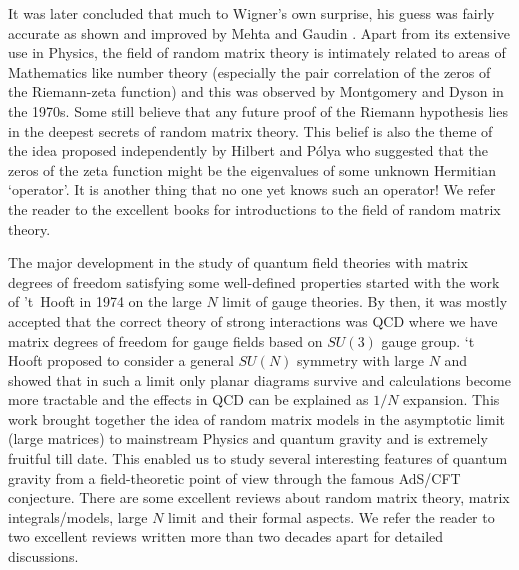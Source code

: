 \documentclass[letter,11pt]{article}
\begin{document}
It was later concluded that much to Wigner's own surprise, 
his guess was fairly accurate as shown and improved by Mehta \cite{MEHTA1960395} and 
Gaudin \cite{GAUDIN1961447}. Apart from its extensive use in Physics, the field of random matrix theory is intimately related to areas of Mathematics like number theory 
(especially the pair correlation of the zeros of the Riemann-zeta function) and this was 
observed by Montgomery and Dyson in the 1970s. Some still believe that any future proof of the
Riemann hypothesis lies in the
deepest secrets of random matrix theory. This belief is also the theme of the idea proposed 
independently by  Hilbert and P\'{o}lya who suggested that the zeros of the zeta function 
might be the eigenvalues of some unknown Hermitian `operator'. It is another thing that 
no one yet knows such an operator! We refer the reader to the excellent books 
\cite{Meh2004, Akemann:2011csh} for introductions to the field of random matrix theory. 

The major development in the study of quantum field theories with matrix degrees of freedom satisfying some well-defined properties started with the work of 't~Hooft in 1974 on the large $N$ limit of gauge theories. By then, it was mostly accepted that the correct theory of 
strong interactions was QCD where we have matrix degrees of freedom for gauge fields based on $SU(3)$ gauge group. `t Hooft proposed to consider a general $SU(N)$ 
symmetry with large $N$ and showed that in such a limit only planar diagrams survive and calculations become more tractable and the effects in QCD can be explained as $1/N$ expansion. This work brought together the idea of random matrix models in the asymptotic limit (large matrices) to mainstream Physics and quantum gravity and is extremely fruitful till date. This enabled us to study several interesting features of quantum gravity 
from a field-theoretic point of view through the famous AdS/CFT conjecture.
There are some excellent reviews about random matrix theory, matrix integrals/models, large $N$ limit 
and their formal aspects. We refer the reader to two excellent reviews written more than two decades 
apart \cite{DiFrancesco:1993cyw,Eynard:2015aea} for detailed discussions. \\
\end{document}

